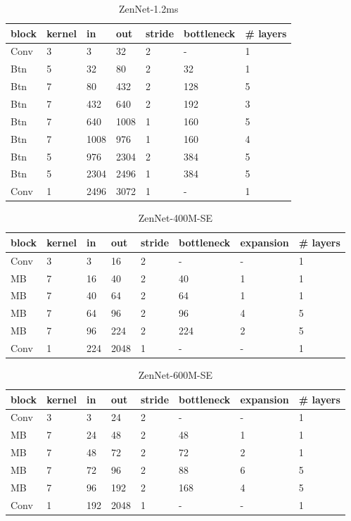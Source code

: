 \documentclass{article}
\providecommand{\tabularnewline}{\\}
\providecommand{\tabularnewline}{\\}
\begin{document}
\begin{table}[!h]
 \begin{center}
   \begin{tabular}{lllllll}
     \toprule 
     block & kernel & in & out & stride & bottleneck & \# layers\tabularnewline
     \midrule
     \midrule
     Conv & 3 & 3 & 32 & 2 & - & 1\tabularnewline
     \midrule
     Btn & 5 & 32 & 80 & 2 & 32 & 1\tabularnewline
     \midrule
     Btn & 7 & 80 & 432 & 2 & 128 & 5\tabularnewline
     \midrule
     Btn & 7 & 432 & 640 & 2 & 192 & 3\tabularnewline
     \midrule
     Btn & 7 & 640 & 1008 & 1 & 160 & 5\tabularnewline
     \midrule
     Btn & 7 & 1008 & 976 & 1 & 160 & 4\tabularnewline
     \midrule
     Btn & 5 & 976 & 2304 & 2 & 384 & 5\tabularnewline
     \midrule
     Btn & 5 & 2304 & 2496 & 1 & 384 & 5\tabularnewline
     \midrule
     Conv & 1 & 2496 & 3072 & 1 & - & 1\tabularnewline
     \bottomrule
     \end{tabular}
 \end{center}
 \caption{ZenNet-1.2ms}
 \label{tab:struct-ZenNet-1.2ms}
\end{table}

\begin{table}[!h]
 \begin{center}
   \begin{tabular}{llllllll}
     \toprule 
     block & kernel & in & out & stride & bottleneck & expansion & \# layers\tabularnewline
     \midrule
     \midrule
Conv & 3 & 3 & 16 & 2 & - & - & 1 \tabularnewline
\midrule
MB & 7 & 16 & 40 & 2 & 40 & 1 & 1 \tabularnewline
\midrule
MB & 7 & 40 & 64 & 2 & 64 & 1 & 1 \tabularnewline
\midrule
MB & 7 & 64 & 96 & 2 & 96 & 4 & 5 \tabularnewline
\midrule
MB & 7 & 96 & 224 & 2 & 224 & 2 & 5 \tabularnewline
\midrule
Conv & 1 & 224 & 2048 & 1 & - & - & 1 \tabularnewline
     \bottomrule
     \end{tabular}        
 \end{center}
 \caption{ZenNet-400M-SE}
 \label{tab:struct-ZenNet-400M-SE}
\end{table}


\begin{table}[!h]
 \begin{center}
   \begin{tabular}{llllllll}
     \toprule 
     block & kernel & in & out & stride & bottleneck & expansion & \# layers\tabularnewline
     \midrule
     \midrule
Conv & 3 & 3 & 24 & 2 & - & - & 1 \tabularnewline
\midrule
MB & 7 & 24 & 48 & 2 & 48 & 1 & 1 \tabularnewline
\midrule
MB & 7 & 48 & 72 & 2 & 72 & 2 & 1 \tabularnewline
\midrule
MB & 7 & 72 & 96 & 2 & 88 & 6 & 5 \tabularnewline
\midrule
MB & 7 & 96 & 192 & 2 & 168 & 4 & 5 \tabularnewline
\midrule
Conv & 1 & 192 & 2048 & 1 & - & - & 1 \tabularnewline
     \bottomrule
     \end{tabular}        
 \end{center}
 \caption{ZenNet-600M-SE}
 \label{tab:struct-ZenNet-600M-SE}
\end{table}
\end{document}
